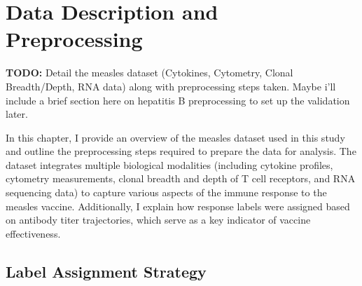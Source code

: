 \documentclass[12pt,a4paper]{report}
\newcommand{\todo}[1]{%
  \par\noindent%
  \begin{tcolorbox}[colback=yellow, colframe=black, boxrule=0.5pt, sharp corners, width=\linewidth, before skip=5pt, after skip=5pt]
    \textbf{TODO:} #1
  \end{tcolorbox}%
  \par
}
\newcommand{\remark}[1]{%
  \par\noindent%
  \begin{tcolorbox}[ colback=orange!20!white, colframe=orange!80!black, boxrule=0.5pt, sharp corners, width=\linewidth, ]
    {\textbf{\textcolor{orange!80!black}!REMARK:}}~#1
  \end{tcolorbox}%
}
\begin{document}
\chapter{Data Description and Preprocessing}
\todo{Detail the measles dataset (Cytokines, Cytometry, Clonal Breadth/Depth, RNA data) along with preprocessing steps taken.
Maybe i'll include a brief section here on hepatitis B preprocessing to set up the validation later.}
\noindent
In this chapter, I provide an overview of the measles dataset used in this study and outline the preprocessing steps required to prepare the data for analysis. The dataset integrates multiple biological modalities (including cytokine profiles, cytometry measurements, clonal breadth and depth of T cell receptors, and RNA sequencing data) to capture various aspects of the immune response to the measles vaccine. Additionally, I explain how response labels were assigned based on antibody titer trajectories, which serve as a key indicator of vaccine effectiveness.

\section{Label Assignment Strategy}
\end{document}
